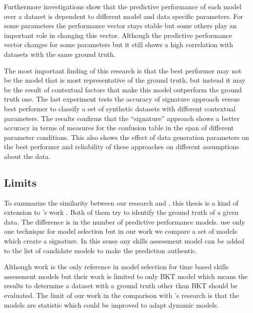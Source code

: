 Furthermore investigations show that the predictive performance of each model over a dataset is dependent to different model and data specific parameters. For some parameters the performance vector stays stable but some others play an important role in changing this vector. Although the predictive performance vector changes for some parameters but it still shows a high correlation with datasets with the same ground truth.


The most important finding of this research is that the best performer may not be the model that is most representative of the ground truth, but instead it may be the result of contextual factors that make this model outperform the ground truth one. The last experiment tests the accuracy of signature approach versus best performer to classify a set of synthetic datasets with different contextual parameters. The results confirms that the ``signature'' approach shows a better accuracy in terms of measures for the confusion table in the span of different parameter conditions. This also shows the effect of data generation parameters on the best performer and reliability of these approaches on different assumptions about the data.

\subsection{Limits}


To summarize the similarity between our research and \cite{Desmarais2010}, this thesis is a kind of extension to \citet{Desmarais2010}'s work . Both of them try to identify the ground truth of a given data. The difference is in the number of predictive performance models. \citet{Desmarais2010} use only one technique for model selection but in our work we compare a set of models which create a signature. In this sense any skills assessment model can be added to the list of candidate models to make the prediction authentic.

Although \citet{Rosenberg2015} work is the only reference in model selection for time based skills assessment models but their work is limited to only BKT model which means the results to determine a dataset with a ground truth other than BKT should be evaluated. The limit of our work in the comparison with \citet{Rosenberg2015}'s research is that the models are statistic which could be improved to adapt dynamic models.





